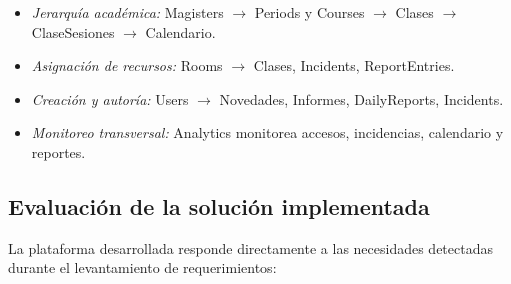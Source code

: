 \begin{itemize}
    \item \textit{Jerarquía académica:} Magisters $\rightarrow$ Periods y Courses $\rightarrow$ Clases $\rightarrow$ ClaseSesiones $\rightarrow$ Calendario.
    \item \textit{Asignación de recursos:} Rooms $\rightarrow$ Clases, Incidents, ReportEntries.
    \item \textit{Creación y autoría:} Users $\rightarrow$ Novedades, Informes, DailyReports, Incidents.
    \item \textit{Monitoreo transversal:} Analytics monitorea accesos, incidencias, calendario y reportes.
\end{itemize}

\subsection{Evaluación de la solución implementada}

La plataforma desarrollada responde directamente a las necesidades detectadas durante el levantamiento de requerimientos:

